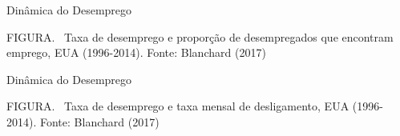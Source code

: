 \documentclass[10pt]{beamer}
\begin{document}
\begin{frame}{Dinâmica do Desemprego}
    \begin{center}
		\begin{minipage}[b]{.9\textwidth}
			\tiny{{\scshape FIGURA}. \ Taxa de desemprego e proporção de desempregados que encontram emprego, EUA (1996-2014). Fonte: Blanchard (2017)} 
		\end{minipage}
	\end{center}
\end{frame}

\begin{frame}{Dinâmica do Desemprego}
    \begin{center}
		\begin{minipage}[b]{.9\textwidth}
			\tiny{{\scshape FIGURA}. \ Taxa de desemprego e taxa mensal de desligamento, EUA (1996-2014). Fonte: Blanchard (2017)} 
		\end{minipage}
	\end{center}
\end{frame}
\end{document}
